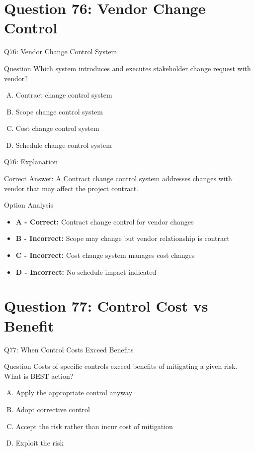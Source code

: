 \documentclass{beamer}
\begin{document}
	\section{Question 76: Vendor Change Control}
	
	\begin{frame}{Q76: Vendor Change Control System}
		\begin{block}{Question}
			Which system introduces and executes stakeholder change request with vendor?
		\end{block}
		\begin{enumerate}[(A)]
			\item Contract change control system
			\item Scope change control system
			\item Cost change control system\item Schedule change control system
		\end{enumerate}
	\end{frame}
	
	\begin{frame}{Q76: Explanation}
		\begin{block}{Correct Answer: A}
			Contract change control system addresses changes with vendor that may affect the project contract.
		\end{block}
		\begin{block}{Option Analysis}
			\begin{itemize}
				\item \textbf{A - Correct:} Contract change control for vendor changes
				\item \textbf{B - Incorrect:} Scope may change but vendor relationship is contract
				\item \textbf{C - Incorrect:} Cost change system manages cost changes
				\item \textbf{D - Incorrect:} No schedule impact indicated
			\end{itemize}
		\end{block}
	\end{frame}
	
	\section{Question 77: Control Cost vs Benefit}
	
	\begin{frame}{Q77: When Control Costs Exceed Benefits}
		\begin{block}{Question}
			Costs of specific controls exceed benefits of mitigating a given risk. What is BEST action?
		\end{block}
		\begin{enumerate}[(A)]
			\item Apply the appropriate control anyway
			\item Adopt corrective control
			\item Accept the risk rather than incur cost of mitigation
			\item Exploit the risk
		\end{enumerate}
	\end{frame}
	
\end{document}
